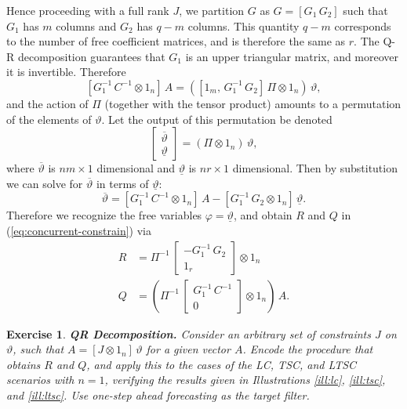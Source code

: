 \documentclass[a4paper]{book}
\newtheorem{Exercise}{Exercise}
\begin{document}
 Hence  proceeding with a full rank $J$, we partition $G$ as $G = [ G_1 \, G_2]$ 
 such that $G_1$ has $m$ columns and $G_2$
 has $q-m$ columns.  This quantity $q-m$ corresponds to the number 
 of free coefficient matrices, and is therefore the same as $r$.
 The Q-R decomposition guarantees that $G_1$ is an upper triangular matrix, 
 and moreover it is invertible.  Therefore
\[
  \left[ G_1^{-1} \, C^{-1} \otimes 1_n \right] \, A  = 
  \left( \left[ 1_m , \, G_1^{-1} \, G_2 \right] \, \Pi \otimes 1_n  \right) \, \vartheta,
\]
 and the action of $\Pi$ (together with the tensor product) amounts 
 to a   permutation of the elements of $\vartheta$.
  Let the output of this permutation be denoted
\[
   \left[ \begin{array}{l} \overline{\vartheta} \\ \underline{\vartheta} \end{array} \right]
   = \left( \Pi \otimes 1_n \right) \, \vartheta,
\]
 where $\overline{\vartheta}$ is $n m \times 1$ dimensional and
 $\underline{\vartheta}$ is $n r \times 1$ dimensional.  
 Then  by substitution we can solve for $\overline{\vartheta}$ in terms 
 of $\underline{\vartheta}$:
\[
   \overline{\vartheta} =  \left[ G_1^{-1} \, C^{-1} \otimes 1_n \right] \, A - 
   \left[  G_1^{-1} \, G_2  \otimes 1_n   \right] \, \underline{\vartheta}.
\]
 Therefore we recognize the free variables $\varphi = \underline{\vartheta}$, 
 and obtain $R$ and $Q$ in (\ref{eq:concurrent-constrain}) via
\begin{align*}
   R & = \Pi^{-1} \, \left[ \begin{array}{c} - G_1^{-1} \, G_2 \\ 
   1_{r} \end{array} \right] \otimes 1_n  \\
  Q & = \left( \Pi^{-1}  \, \left[ \begin{array}{c}  G_1^{-1} \, C^{-1} \\ 0 \end{array} \right] \otimes 1_n  \right) \, A.
\end{align*}


 \begin{Exercise} {\bf QR Decomposition.} \rm
 \label{exer:qr.constraint}
  Consider an arbitrary set of constraints $J$ on $\vartheta$, such that
    $   A = [ J \otimes 1_n ] \, \vartheta$ for a given vector $A$.  
    Encode the procedure that obtains $R$ and $Q$, and apply this
    to the cases of the LC, TSC, and LTSC scenarios with $n=1$, verifying the results
    given in Illustrations \ref{ill:lc}, \ref{ill:tsc}, and \ref{ill:ltsc}.
    Use one-step ahead forecasting as the target filter.
 \end{Exercise}
 
\end{document}
